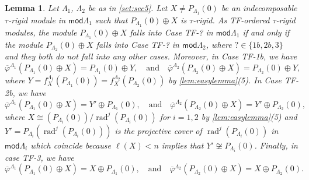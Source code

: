 \documentclass[11pt]{amsart}
\newcommand{\mods}{\mathsf{mod}}
\DeclareMathOperator{\rad}{\mathrm{rad}}
\newtheorem{lemma}[theorem]{Lemma}
\theoremstyle{definition}
\begin{document}
\begin{lemma}\label{lem:mutcase1}
    Let $\Lambda_1$, $\Lambda_2$ be as in \cref{set:sec5}. Let $X \neq P_{\Lambda_1}(0)$ be an indecomposable $\tau$-rigid module in $\mods \Lambda_1$ such that $P_{\Lambda_1}(0) \oplus X$ is $\tau$-rigid. As TF-ordered $\tau$-rigid modules, the module $P_{\Lambda_1}(0) \oplus X$ falls into Case TF-\textnormal{?} in $\mods \Lambda_1$ if and only if the module $P_{\Lambda_2}(0) \oplus X$ falls into Case TF-\textnormal{?} in $\mods \Lambda_2$, where $? \in \{1b, 2b, 3\}$ and they both do not fall into any other cases. Moreover, in Case TF-1b, we have
    \[ \overline{\varphi}^{\Lambda_1}( P_{\Lambda_1}(0) \oplus X) = P_{\Lambda_1}(0) \oplus Y, \quad \text{and} \quad \overline{\varphi}^{\Lambda_2}(P_{\Lambda_2}(0) \oplus X) = P_{\Lambda_2}(0) \oplus Y, \]
    where $Y = f_X^{\Lambda_1}(P_{\Lambda_1}(0)) = f_X^{\Lambda_2}(P_{\Lambda_2}(0))$ by \cref{lem:easylemma}(5). In Case TF-2b, we have
    \[ \overline{\varphi}^{\Lambda_1}( P_{\Lambda_1}(0) \oplus X) = Y' \oplus P_{\Lambda_1}(0) , \quad \text{and} \quad \overline{\varphi}^{\Lambda_2}(P_{\Lambda_2}(0) \oplus X) = Y' \oplus P_{\Lambda_2}(0), \]
    where $X \cong (P_{\Lambda_i}(0))/\rad^j(P_{\Lambda_i}(0))$ for $i=1,2$ by \cref{lem:easylemma}(5) and $Y' = P_{\Lambda_i}(\rad^j(P_{\Lambda_i}(0)))$ is the projective cover of $\rad^j(P_{\Lambda_i}(0))$ in $\mods \Lambda_i$ which coincide because $\ell(X) < n$ implies that $Y' \not \cong P_{\Lambda_i}(0)$. Finally, in case TF-3, we have
    \[ \overline{\varphi}^{\Lambda_1}( P_{\Lambda_1}(0) \oplus X) = X \oplus P_{\Lambda_1}(0), \quad \text{and} \quad \overline{\varphi}^{\Lambda_2}( P_{\Lambda_2}(0) \oplus X) = X \oplus P_{\Lambda_2}(0). \]
\end{lemma}
\end{document}
